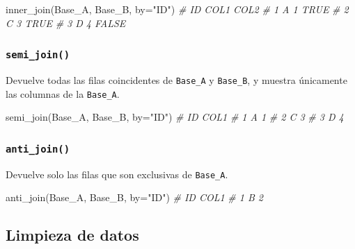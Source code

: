 \documentclass[
]{article}
\newenvironment{Shaded}{\begin{snugshade}}{\end{snugshade}}
\newcommand{\AttributeTok}[1]{\textcolor[rgb]{0.77,0.63,0.00}{#1}}
\newcommand{\CommentTok}[1]{\textcolor[rgb]{0.56,0.35,0.01}{\textit{#1}}}
\newcommand{\FunctionTok}[1]{\textcolor[rgb]{0.00,0.00,0.00}{#1}}
\newcommand{\NormalTok}[1]{#1}
\newcommand{\StringTok}[1]{\textcolor[rgb]{0.31,0.60,0.02}{#1}}
\theoremstyle{definition}
\theoremstyle{definition}
\theoremstyle{definition}
\theoremstyle{definition}
\theoremstyle{remark}
\begin{document}
\begin{Shaded}
\begin{Highlighting}[]
\FunctionTok{inner\_join}\NormalTok{(Base\_A, Base\_B, }\AttributeTok{by=}\StringTok{"ID"}\NormalTok{)}
\CommentTok{\#   ID COL1  COL2}
\CommentTok{\# 1  A    1  TRUE}
\CommentTok{\# 2  C    3  TRUE}
\CommentTok{\# 3  D    4 FALSE}
\end{Highlighting}
\end{Shaded}

\hypertarget{semi_join}{%
\subsubsection{\texorpdfstring{\texttt{semi\_join()}}{semi\_join()}}\label{semi_join}}

Devuelve todas las filas coincidentes de \texttt{Base\_A} y \texttt{Base\_B}, y muestra únicamente las columnas de la \texttt{Base\_A}.

\begin{Shaded}
\begin{Highlighting}[]
\FunctionTok{semi\_join}\NormalTok{(Base\_A, Base\_B, }\AttributeTok{by=}\StringTok{"ID"}\NormalTok{)}
\CommentTok{\#   ID COL1}
\CommentTok{\# 1  A    1}
\CommentTok{\# 2  C    3}
\CommentTok{\# 3  D    4}
\end{Highlighting}
\end{Shaded}

\hypertarget{anti_join}{%
\subsubsection{\texorpdfstring{\texttt{anti\_join()}}{anti\_join()}}\label{anti_join}}

Devuelve solo las filas que son exclusivas de \texttt{Base\_A}.

\begin{Shaded}
\begin{Highlighting}[]
\FunctionTok{anti\_join}\NormalTok{(Base\_A, Base\_B, }\AttributeTok{by=}\StringTok{"ID"}\NormalTok{)}
\CommentTok{\#   ID COL1}
\CommentTok{\# 1  B    2}
\end{Highlighting}
\end{Shaded}

\hypertarget{limpieza-de-datos}{%
\subsection{Limpieza de datos}\label{limpieza-de-datos}}
\end{document}
